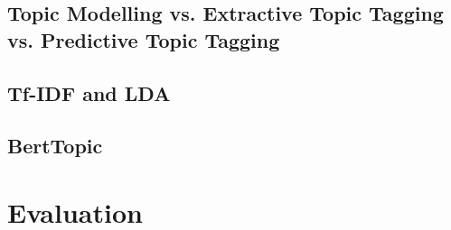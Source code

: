 \subsection{Topic Modelling vs. Extractive Topic Tagging vs. Predictive Topic Tagging}



\subsection{Tf-IDF and LDA}

\subsection{BertTopic}


\section{Evaluation}